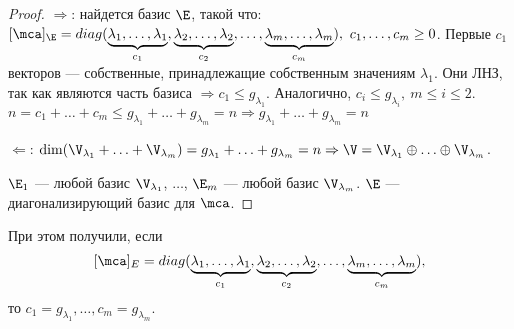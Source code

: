 \documentclass[main]{subfiles}
\begin{document}
\begin{proof}
    $\Rightarrow$: найдется базис $\E$, такой что:
    $[\mca]_\E = diag(\underbrace{\lambda_1, \ldots, \lambda_1}_{c_1},
        \underbrace{\lambda_2, \ldots, \lambda_2}_{c_2}, \ldots,
        \underbrace{\lambda_m, \ldots, \lambda_m}_{c_m}), \  c_1, \ldots, c_m \geq 0$.
    Первые $c_1$  векторов  — собственные, принадлежащие собственным значениям
    $\lambda_1$. Они ЛНЗ, так как являются часть базиса $\Rightarrow c_1 \leq g_{\lambda_1}$.
    Аналогично, $c_i \leq g_{\lambda_i},\ m \leq i \leq 2$.
    $n = c_1 + \ldots + c_m \leq g_{\lambda_1} + \ldots + g_{\lambda_m} = n
        \Rightarrow g_{\lambda_1} + \ldots + g_{\lambda_m} = n$

    $\Leftarrow$: $\dim (\V_{\lambda_1} + \ldots + \V_{\lambda_m}) =
        g_{\lambda_1} + \ldots + g_{\lambda_m} = n \Rightarrow
        \V = \V_{\lambda_1} \oplus \ldots \oplus  \V_{\lambda_m}$.

    $\E_1$  — любой базис $\V_{\lambda_1}$, $\ldots$,
    $\E_m$  — любой базис $\V_{\lambda_m}$.
    $\E$  — диагонализирующий базис для $\mca$.
\end{proof}

\begin{remark}
    При этом получили, если
    \[[\mca]_E = diag(\underbrace{\lambda_1, \ldots, \lambda_1}_{c_1},
        \underbrace{\lambda_2, \ldots, \lambda_2}_{c_2}, \ldots,
        \underbrace{\lambda_m, \ldots, \lambda_m}_{c_m}),\]
    то $c_1 = g_{\lambda_1}, \ldots,c_m = g_{\lambda_m}$.
\end{remark}
\end{document}
